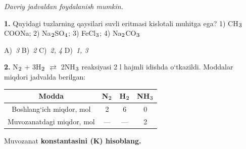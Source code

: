 \documentclass[11pt,a4paper]{article}
\renewcommand{\normalsize}{\fontsize{10.9}{13.4}\selectfont}
\renewcommand{\textsubscript}[1]{\ensuremath{_{\text{\fontsize{8}{8}\selectfont #1}}}}
\begin{document}
\normalsize
\thispagestyle{first}
\noindent{}
\par\medskip
\noindent\textit{Davriy jadvaldan foydalanish mumkin.}
\par\medskip
\begin{multicols}{2}
\noindent\textbf{1.} Quyidagi tuzlarning qaysilari suvli eritmasi kislotali muhitga ega? 1) CH\textsubscript{3}COONa; 2) Na\textsubscript{2}SO\textsubscript{4}; 3) FeCl\textsubscript{3}; 4) Na\textsubscript{2}CO\textsubscript{3}

\noindent A)~\textsl{3} \hfill B)~\textsl{2} \hfill C)~\textsl{2, 4} \hfill D)~\textsl{1, 3}\par
\vspace{4pt}
\end{multicols}
\noindent\textbf{2.} N\textsubscript{2} + 3H\textsubscript{2} $\rightleftarrows$ 2NH\textsubscript{3} reaksiyasi 2 l hajmli idishda o`tkazildi. Moddalar miqdori jadvalda berilgan:
\begin{center}
\renewcommand{\arraystretch}{1.15}
\begin{tabular}{|c|c|c|c|}\hline
\textbf{Modda} & \textbf{N\textsubscript{2}} & \textbf{H\textsubscript{2}} & \textbf{NH\textsubscript{3}} \\ \hline
Boshlang`ich miqdor, mol & 2 & 6 & 0 \\ \hline
Muvozanatdagi miqdor, mol & --- & --- & 2 \\ \hline
\end{tabular}
\end{center}
Muvozanat \textbf{konstantasini (K) hisoblang.}
\end{document}
